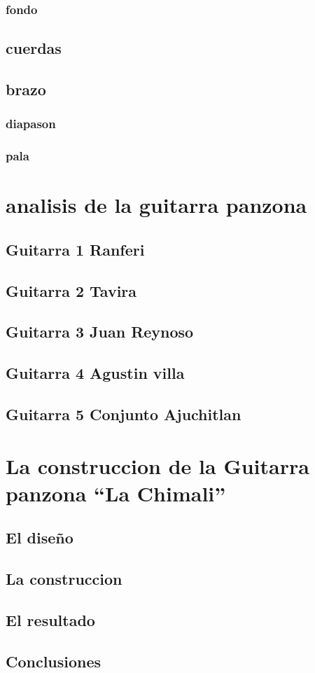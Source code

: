 \documentclass[a4paper]{article}
\begin{document}
\subsubsection{fondo}
\subsection{cuerdas}
\subsection{brazo}
\subsubsection{diapason}
\subsubsection{pala}
\section{analisis de la guitarra panzona}
\subsection{Guitarra 1 Ranferi}
\subsection{Guitarra 2 Tavira}
\subsection{Guitarra 3 Juan Reynoso}
\subsection{Guitarra 4 Agustin villa}
\subsection{Guitarra 5 Conjunto Ajuchitlan}
\section{La construccion de la Guitarra panzona ``La Chimali''}


\subsection{El diseño}



\subsection{La construccion}


\subsection{El resultado}


\subsection{Conclusiones}


\end{document}

